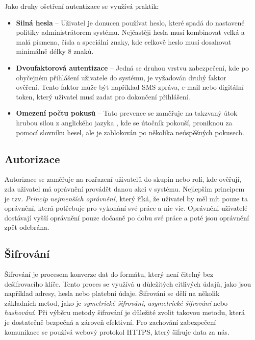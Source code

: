 \noindent
Jako druhy ošetření autentizace se využívá praktik:
\begin{itemize}
    \item \textbf{Silná hesla} -- Uživatel je donucen používat heslo, které spadá do nastavené politiky administrátorem systému. Nejčastěji hesla musí kombinovat velká a malá písmena, čísla a speciální znaky, kde celkově heslo musí dosahovat minimálně délky 8 znaků.
    \item \textbf{Dvoufaktorová autentizace} -- Jedná se druhou vrstvu zabezpečení, kde po obyčejném přihlášení uživatele do systému, je vyžadován druhý faktor ověření. Tento faktor může být například SMS zpráva, e-mail nebo digitální token, který uživatel musí zadat pro dokončení přihlášení.
    \item \textbf{Omezení počtu pokusů} -- Tato prevence se zaměřuje na takzvaný útok hrubou silou z anglického jazyka \textit{}, kde se útočník pokouší, proniknou za pomocí slovníku hesel, ale je zablokován po několika neúspěšných pokusech.
\end{itemize}

\subsection{Autorizace}
\label{subsec:security-authorization}
Autorizace se zaměřuje na rozřazení uživatelů do skupin nebo rolí, kde ověřují, zda uživatel má oprávnění provádět danou akci v systému. Nejlepším principem je tzv. \textit{Princip nejmenších oprávnění}, který říká, že uživatel by měl mít pouze ta oprávnění, která potřebuje pro vykonání své práce a nic víc. Oprávněni uživatelé dostávají vyšší oprávnění pouze dočasně po dobu své práce a poté jsou oprávnění zpět odebrána.

\subsection{Šifrování}
\label{subsec:security-encryption}
Šifrování je procesem konverze dat do formátu, který není čitelný bez dešifrovacího klíče. Tento proces se využívá u důležitých citlivých údajů, jako jsou například adresy, hesla nebo platební údaje. Šifrování se dělí na několik základních metod, jako je \textit{symetrické šifrování}, \textit{asymetrické šifrování} nebo \textit{hashování}. Při výběru metody šifrování je důležité zvolit takovou metodu, která je dostatečně bezpečná a zároveň efektivní. Pro zachování zabezpečení komunikace se používá webový protokol HTTPS, který šifruje data za nás.

